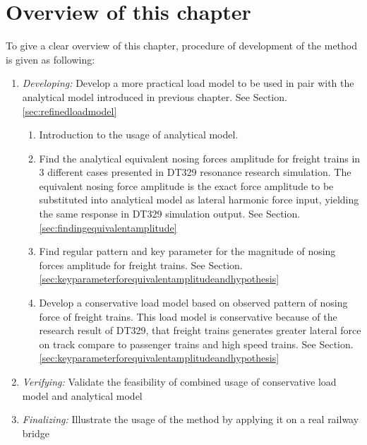 \section{Overview of this chapter}

To give a clear overview of this chapter, procedure of development of the method is given as following:

\begin{enumerate}
    \item \textit{Developing:} Develop a more practical load model to be used in pair with the analytical model introduced in previous chapter. See Section.\ref{sec:refinedloadmodel}
        \begin{enumerate}[label*=\arabic*.]
            \item Introduction to the usage of analytical model.  
            \item Find the analytical equivalent nosing forces amplitude for freight trains in 3 different cases presented in DT329 resonance research simulation. The equivalent nosing force amplitude is the exact force amplitude to be substituted into analytical model as lateral harmonic force input, yielding the same response in DT329 simulation output. See Section.\ref{sec:findingequivalentamplitude}
            \item Find regular pattern and key parameter for the magnitude of nosing forces amplitude for freight trains. See Section.\ref{sec:keyparameterforequivalentamplitudeandhypothesis}
            \item Develop a conservative load model based on observed pattern of nosing force of freight trains. This load model is conservative because of the research result of DT329, that freight trains generates greater lateral force on track compare to passenger trains and high speed trains. See Section.\ref{sec:keyparameterforequivalentamplitudeandhypothesis}
        \end{enumerate} 
    \item \textit{Verifying:} Validate the feasibility of combined usage of conservative load model and analytical model
    \item \textit{Finalizing:} Illustrate the usage of the method by applying it on a real railway bridge
\end{enumerate}

